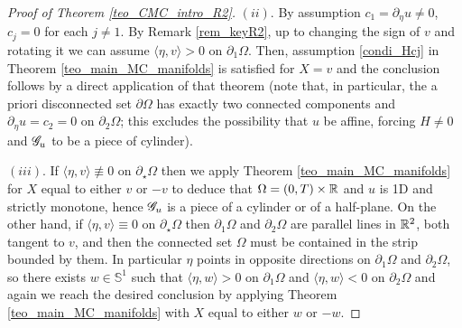 \documentclass[10 pt,a4paper]{article}
\theoremstyle{definition}
\begin{document}
\begin{proof}[Proof of Theorem \ref{teo_CMC_intro_R2}]
	$(ii)$. By assumption $c_1 = \partial_\eta u \neq 0$, $c_j = 0$ for each $j\neq 1$. By Remark \ref{rem_keyR2}, up to changing the sign of $v$ and rotating it we can assume $\langle\eta,v\rangle > 0$ on $\partial_1\Omega$. Then, assumption \eqref{condi_Hcj} in Theorem \ref{teo_main_MC_manifolds} is satisfied for $X = v$ and the conclusion follows by a direct application of that theorem (note that, in particular, the a priori disconnected set $\partial\Omega$ has exactly two connected components and $\partial_\eta u = c_2 = 0$ on $\partial_2\Omega$; this excludes the possibility that $u$ be affine, forcing $H\neq 0$ and $\mathscr{G}_u$ to be a piece of cylinder). 
	
	$(iii)$. If $\langle\eta,v\rangle\not\equiv 0$ on $\partial_\star\Omega$ then we apply Theorem \ref{teo_main_MC_manifolds} for $X$ equal to either $v$ or $-v$ to deduce that $\Omega =(0,T)\times\mathbb R$ and $u$ is 1D and strictly monotone, hence $\mathscr{G}_u$ is a piece of a cylinder or of a half-plane. On the other hand, if $\langle\eta,v\rangle\equiv 0$ on $\partial_\star\Omega$ then $\partial_1\Omega$ and $\partial_2\Omega$ are parallel lines in $\mathbb R^2$, both tangent to $v$, and then the connected set $\Omega$ must be contained in the strip bounded by them. In particular $\eta$ points in opposite directions on $\partial_1\Omega$ and $\partial_2\Omega$, so there exists $w\in\mathbb{S}^1$ such that $\langle\eta,w\rangle>0$ on $\partial_1\Omega$ and $\langle\eta,w\rangle<0$ on $\partial_2\Omega$ and again we reach the desired conclusion by applying Theorem \ref{teo_main_MC_manifolds} with $X$ equal to either $w$ or $-w$.
	

\end{proof}
\end{document}
